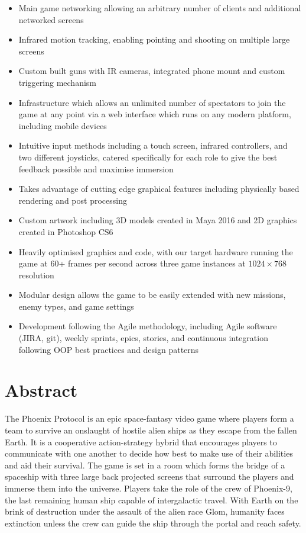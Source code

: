 \documentclass[a4paper,11pt]{article}
\begin{document}
\begin{itemize}
  \large

  \item Main game networking allowing an arbitrary number of clients and additional networked screens
  \item Infrared motion tracking, enabling pointing and shooting on multiple large screens
  \item Custom built guns with IR cameras, integrated phone mount and custom triggering mechanism
  \item Infrastructure which allows an unlimited number of spectators to join the game at any point via a web interface which runs on any modern platform, including mobile devices
  \item Intuitive input methods including a touch screen, infrared controllers, and two different joysticks, catered specifically for each role to give the best feedback possible and maximise immersion 
  \item Takes advantage of cutting edge graphical features including physically based rendering and post processing
  \item Custom artwork including 3D models created in Maya 2016 and 2D graphics created in Photoshop CS6
  \item Heavily optimised graphics and code, with our target hardware running the game at 60+ frames per second across three game instances at $1024 \times 768$ resolution
    \item Modular design allows the game to be easily extended with new missions, enemy types, and game settings
  \item Development following the Agile methodology, including Agile software (JIRA, git), weekly sprints, epics, stories, and continuous integration following OOP best practices and design patterns
\end{itemize}

\section{Abstract}
The Phoenix Protocol is an epic space-fantasy video game where players form a team to survive an onslaught of hostile alien ships as they escape from the fallen Earth. It is a cooperative action-strategy hybrid that encourages players to communicate with one another to decide how best to make use of their abilities and aid their survival. The game is set in a room which forms the bridge of a spaceship with three large back projected screens that surround the players and immerse them into the universe. 
Players take the role of the crew of Phoenix-9, the last remaining human ship capable of intergalactic travel. With Earth on the brink of destruction under the assault of the alien race Glom, humanity faces extinction unless the crew can guide the ship through the portal and reach safety.
\end{document}
